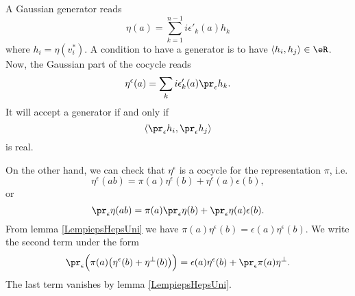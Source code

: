A Gaussian generator reads
\begin{equation}
    \eta(a)=\sum_{k=1}^{n-1}i\epsilon'_k(a)h_k
\end{equation}
where \(h_i=\eta(v_i^*)\). A condition to have a generator is to have \(\langle h_i, h_j\rangle \in\eR\). Now, the Gaussian part of the cocycle reads
\begin{equation}
    \eta^{\epsilon}(a)=\sum_ki\epsilon'_k(a)\pr_{\epsilon}h_k.
\end{equation}
It will accept a generator if and only if
\begin{equation}
    \langle \pr_{\epsilon}h_i, \pr_{\epsilon}h_j\rangle 
\end{equation}
is real.

On the other hand, we can check that \(\eta^{\epsilon}\) is a cocycle for the representation \(\pi\), i.e.
\begin{equation}
    \eta^{\epsilon}(ab)=\pi(a)\eta^{\epsilon}(b)+\eta^{\epsilon}(a)\epsilon(b),
\end{equation}
or
\begin{equation}
    \pr_{\epsilon}\eta(ab)=\pi(a)\pr_{\epsilon}\eta(b)+\pr_{\epsilon}\eta(a)\epsilon(b).
\end{equation}
From lemma \ref{LempiepsHepsUni} we have \(\pi(a)\eta^{\epsilon}(b)=\epsilon(a)\eta^{\epsilon}(b)\). We write the second term under the form
\begin{equation}
    \pr_{\epsilon}\Big( \pi(a)\big( \eta^{\epsilon}(b)+\eta^{\perp}(b) \big) \Big)=\epsilon(a)\eta^{\epsilon}(b)+\pr_{\epsilon}\pi(a)\eta^{\perp}.
\end{equation}
The last term vanishes by lemma \ref{LempiepsHepsUni}.
